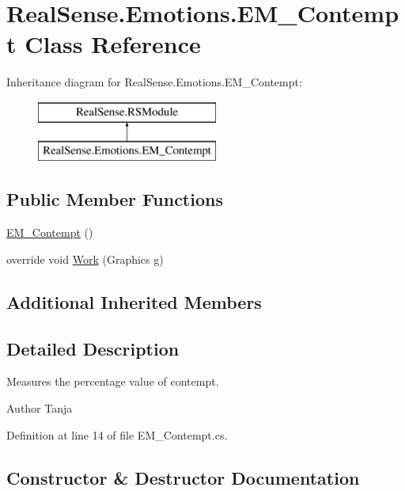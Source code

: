 \hypertarget{class_real_sense_1_1_emotions_1_1_e_m___contempt}{}\section{Real\+Sense.\+Emotions.\+E\+M\+\_\+\+Contempt Class Reference}
\label{class_real_sense_1_1_emotions_1_1_e_m___contempt}
Inheritance diagram for Real\+Sense.\+Emotions.\+E\+M\+\_\+\+Contempt\+:\begin{figure}[H]
\begin{center}
\leavevmode
\includegraphics[height=2.000000cm]{class_real_sense_1_1_emotions_1_1_e_m___contempt}
\end{center}
\end{figure}
\subsection*{Public Member Functions}
\begin{DoxyCompactItemize}
\item 
\hyperlink{class_real_sense_1_1_emotions_1_1_e_m___contempt_af2203e6c540c756cd6b8d0190d04c46f}{E\+M\+\_\+\+Contempt} ()
\item 
override void \hyperlink{class_real_sense_1_1_emotions_1_1_e_m___contempt_a7ea208f926c1888f028cbe6d6fe14e2f}{Work} (Graphics g)
\end{DoxyCompactItemize}
\subsection*{Additional Inherited Members}


\subsection{Detailed Description}
Measures the percentage value of contempt. \begin{DoxyAuthor}{Author}
Tanja 
\end{DoxyAuthor}


Definition at line 14 of file E\+M\+\_\+\+Contempt.\+cs.



\subsection{Constructor \& Destructor Documentation}
\mbox{\label{class_real_sense_1_1_emotions_1_1_e_m___contempt_af2203e6c540c756cd6b8d0190d04c46f}} 
